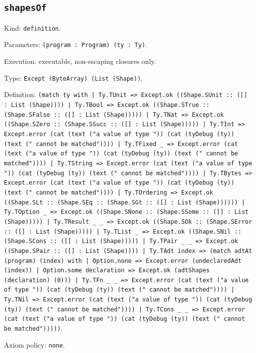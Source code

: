 \documentclass[11pt]{article}
\begin{document}
\subsection*{\texttt{shapesOf}}
\noindent Kind: \texttt{definition}.\par
\noindent Parameters: \texttt{(program : Program) (ty : Ty)}.\par
\noindent Execution: executable, non-escaping closures only.\par
\noindent Type: \texttt{Except (ByteArray) (List (Shape))}.\par
\noindent Definition: \texttt{(match ty with | Ty.TUnit => Except.ok ((Shape.SUnit :: ([] : List (Shape)))) | Ty.TBool => Except.ok ((Shape.STrue :: (Shape.SFalse :: ([] : List (Shape))))) | Ty.TNat => Except.ok ((Shape.SZero :: (Shape.SSucc :: ([] : List (Shape))))) | Ty.TInt => Except.error (cat (text ("a value of type ")) (cat (tyDebug (ty)) (text (" cannot be matched")))) | Ty.TFixed \_ => Except.error (cat (text ("a value of type ")) (cat (tyDebug (ty)) (text (" cannot be matched")))) | Ty.TString => Except.error (cat (text ("a value of type ")) (cat (tyDebug (ty)) (text (" cannot be matched")))) | Ty.TBytes => Except.error (cat (text ("a value of type ")) (cat (tyDebug (ty)) (text (" cannot be matched")))) | Ty.TOrdering => Except.ok ((Shape.SLt :: (Shape.SEq :: (Shape.SGt :: ([] : List (Shape)))))) | Ty.TOption \_ => Except.ok ((Shape.SNone :: (Shape.SSome :: ([] : List (Shape))))) | Ty.TResult \_ \_ => Except.ok ((Shape.SOk :: (Shape.SError :: ([] : List (Shape))))) | Ty.TList \_ => Except.ok ((Shape.SNil :: (Shape.SCons :: ([] : List (Shape))))) | Ty.TPair \_ \_ => Except.ok ((Shape.SPair :: ([] : List (Shape)))) | Ty.TAdt index => (match adtAt (program) (index) with | Option.none => Except.error (undeclaredAdt (index)) | Option.some declaration => Except.ok (adtShapes (declaration) (0))) | Ty.TFn \_ \_ => Except.error (cat (text ("a value of type ")) (cat (tyDebug (ty)) (text (" cannot be matched")))) | Ty.TNil => Except.error (cat (text ("a value of type ")) (cat (tyDebug (ty)) (text (" cannot be matched")))) | Ty.TCons \_ \_ => Except.error (cat (text ("a value of type ")) (cat (tyDebug (ty)) (text (" cannot be matched")))))}.\par
\noindent Axiom policy: \texttt{none}.\par
\end{document}
